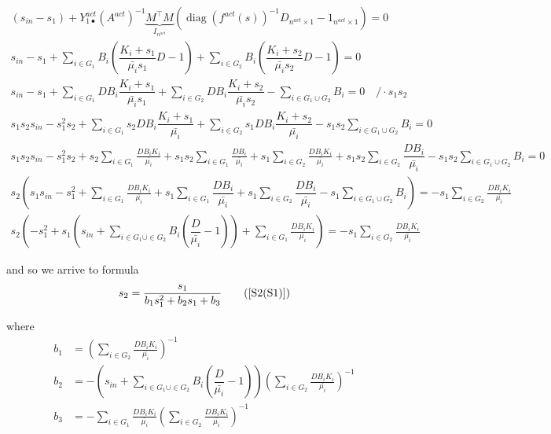 \documentclass[3p,times]{article}
\DeclareMathOperator{\diag}{diag}
\begin{document}
\begin{align}
(s_{in}-s_1) + Y^{act}_{1\bullet}(A^{act})^{-1}\underbrace{M^\top M}_{I_{n^{act}}}(\diag(f^{act}(s))^{-1} D_{n^{act}\times 1} - 1_{n^{act}\times 1}) = 0\\
\displaystyle s_{in} - s_1 + \sum \limits_{i \in G_1} B_i \left(\dfrac{K_i+s_1}{\bar{\mu_i}s_1}D - 1 \right) + \sum \limits_{i \in G_2 } B_i \left(\dfrac{K_i+s_2}{\bar{\mu_i}s_2}D - 1 \right)= 0 \label{to_be_reused}\\
\displaystyle s_{in} - s_1 + \sum \limits_{i \in G_1 } DB_i \dfrac{K_i+s_1}{\bar{\mu_i}s_1}+ \sum \limits_{i \in G_2 } DB_i \dfrac{K_i+s_2}{\bar{\mu_i}s_2} - \sum \limits_{i \in G_1 \cup G_2}B_i= 0 \quad /\cdot s_1s_2 
\\
\displaystyle s_1s_2 s_{in}- s^2_1s_2 + \sum \limits_{i \in G_1} s_2DB_i \dfrac{K_i+s_1}{\bar{\mu_i}}+ \sum \limits_{i \in G_2 } s_1DB_i \dfrac{K_i+s_2}{\bar{\mu_i}} - s_1s_2\sum \limits_{i \in G_1 \cup G_2}B_i= 0 \\
\displaystyle s_1s_2 s_{in}- s^2_1s_2 + s_2\sum \limits_{i \in G_1 } \frac{DB_iK_i}{\bar{\mu_i}}+s_1s_2\sum \limits_{i \in G_1 } \frac{DB_i}{\bar{\mu_i}}+ s_1\sum \limits_{i \in G_2 } \frac{DB_iK_i}{\bar{\mu_i}} + s_1s_2\sum \limits_{i \in G_2 } \dfrac{DB_i}{\bar{\mu_i}} - s_1s_2\sum \limits_{i \in G_1 \cup G_2}B_i= 0 \\
\displaystyle s_2\left(s_1s_{in} - s^2_1 + \sum \limits_{i \in G_1} \frac{DB_iK_i}{\bar{\mu_i}} +s_1\sum \limits_{i \in G_1 } \dfrac{DB_i}{\bar{\mu_i}}+s_1\sum \limits_{i \in G_2 } \dfrac{DB_i}{\bar{\mu_i}}  - s_1\sum \limits_{i \in G_1 \cup G_2}B_i  \right) = - s_1\sum \limits_{i \in G_2 } \frac{DB_iK_i}{\bar{\mu_i}} \\
\displaystyle s_2\left( - s^2_1 +s_1\left(s_{in}+\sum \limits_{i \in G_1 \cup \in G_2 } B_i\left(\dfrac{D}{\bar{\mu_i}}-1\right) \right) + \sum \limits_{i \in G_1} \frac{DB_iK_i}{\bar{\mu_i}}\right) = - s_1\sum \limits_{i \in G_2 } \frac{DB_iK_i}{\bar{\mu_i}}
\end{align}
 
and so we arrive to formula
\begin{align}
s_2 = \frac{s_1}{b_1s_1^2+b_2s_1+b_3} \tag{\ref{S2(S1)}}
\end{align}

where
\begin{align}
\displaystyle b_1 & =  \left(\sum \limits_{i \in G_2 } \frac{DB_iK_i}{\bar{\mu_i}} \right)^{-1} \\
\displaystyle b_2 & = -\left(s_{in}+\sum \limits_{i \in G_1 \cup \in G_2 } B_i\left(\dfrac{D}{\bar{\mu_i}}-1\right) \right) \left(\sum \limits_{i \in G_2 } \frac{DB_iK_i}{\bar{\mu_i}} \right)^{-1} \\
\displaystyle b_3 & = -\sum \limits_{i \in G_1} \frac{DB_iK_i}{\bar{\mu_i}} \left(\sum \limits_{i \in G_2 } \frac{DB_iK_i}{\bar{\mu_i}} \right)^{-1} \\
\end{align} 
\end{document}
